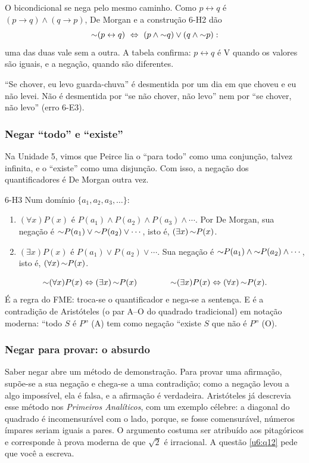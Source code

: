 O bicondicional se nega pelo mesmo caminho. Como $p\leftrightarrow q$ é $(p\rightarrow q)\wedge(q\rightarrow p)$, De Morgan e a construção 6-H2 dão
\[{\nao}(p\leftrightarrow q)\ \Leftrightarrow\ (p\wedge{\nao}q)\vee(q\wedge{\nao}p):\]
uma das duas vale sem a outra. A tabela confirma: $p\leftrightarrow q$ é V quando os valores são iguais, e a negação, quando são diferentes.

\enquote{Se chover, eu levo guarda-chuva} é desmentida por um dia em que choveu e eu não levei. Não é desmentida por \enquote{se não chover, não levo} nem por \enquote{se chover, não levo} (erro 6-E3).

\subsubsection{Negar \enquote{todo} e \enquote{existe}}
Na Unidade 5, vimos que Peirce lia o \enquote{para todo} como uma conjunção, talvez infinita, e o \enquote{existe} como uma disjunção. Com isso, a negação dos quantificadores é De Morgan outra vez.

\begin{construcao}{6-H3}
Num domínio $\{a_1,a_2,a_3,\ldots\}$:
\begin{enumerate}[label=(\arabic*)]
  \item $(\forall x)P(x)$ é $P(a_1)\wedge P(a_2)\wedge P(a_3)\wedge\cdots$. Por De Morgan, sua negação é ${{\sim}}P(a_1)\vee{{\sim}}P(a_2)\vee\cdots$, isto é, $(\exists x)\,{{\sim}}P(x)$.
  \item $(\exists x)P(x)$ é $P(a_1)\vee P(a_2)\vee\cdots$. Sua negação é ${{\sim}}P(a_1)\wedge{{\sim}}P(a_2)\wedge\cdots$, isto é, $(\forall x)\,{{\sim}}P(x)$.
\end{enumerate}
\[{{\sim}}(\forall x)P(x)\Leftrightarrow(\exists x)\,{{\sim}}P(x)\qquad\qquad{{\sim}}(\exists x)P(x)\Leftrightarrow(\forall x)\,{{\sim}}P(x).\]
É a regra do FME: troca-se o quantificador e nega-se a sentença. E é a contradição de Aristóteles (o par A–O do quadrado tradicional) em notação moderna: \enquote{todo $S$ é $P$} (A) tem como negação \enquote{existe $S$ que não é $P$} (O).
\end{construcao}

\subsubsection{Negar para provar: o absurdo}
Saber negar abre um método de demonstração. Para provar uma afirmação, supõe-se a sua negação e chega-se a uma contradição; como a negação levou a algo impossível, ela é falsa, e a afirmação é verdadeira. Aristóteles já descrevia esse método nos \emph{Primeiros Analíticos}, com um exemplo célebre: a diagonal do quadrado é incomensurável com o lado, porque, se fosse comensurável, números ímpares seriam iguais a pares. O argumento costuma ser atribuído aos pitagóricos e corresponde à prova moderna de que $\sqrt2$ é irracional. A questão \ref{u6:q12} pede que você a escreva.

